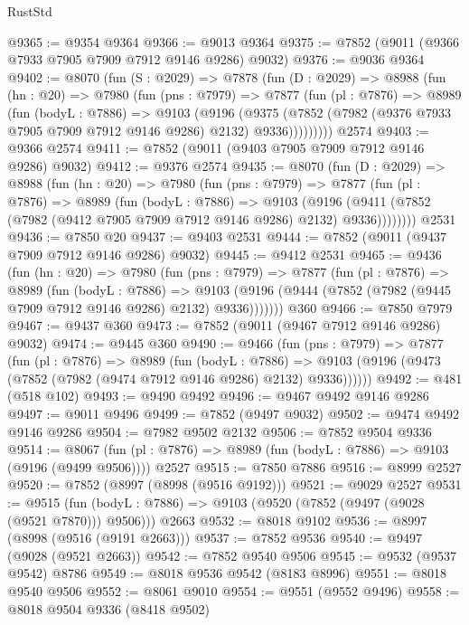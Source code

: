 \begin{lexlean}{RustStd}
\begin{coremodule}
@9365 := @9354 @9364
@9366 := @9013 @9364
@9375 := @7852 (@9011 (@9366 @7933 @7905 @7909 @7912 @9146 @9286) @9032)
@9376 := @9036 @9364
@9402 := @8070
    (fun (S : @2029) =>
    @7878
      (fun (D : @2029) =>
      @8988
        (fun (hn : @20) =>
        @7980
          (fun (pns : @7979) =>
          @7877
            (fun (pl : @7876) =>
            @8989
              (fun (bodyL : @7886) =>
              @9103
                (@9196
                  (@9375
                    (@7852 (@7982 (@9376 @7933 @7905 @7909 @7912 @9146 @9286) @2132) @9336)))))))))
    @2574
@9403 := @9366 @2574
@9411 := @7852 (@9011 (@9403 @7905 @7909 @7912 @9146 @9286) @9032)
@9412 := @9376 @2574
@9435 := @8070
    (fun (D : @2029) =>
    @8988
      (fun (hn : @20) =>
      @7980
        (fun (pns : @7979) =>
        @7877
          (fun (pl : @7876) =>
          @8989
            (fun (bodyL : @7886) =>
            @9103
              (@9196 (@9411 (@7852 (@7982 (@9412 @7905 @7909 @7912 @9146 @9286) @2132) @9336))))))))
    @2531
@9436 := @7850 @20
@9437 := @9403 @2531
@9444 := @7852 (@9011 (@9437 @7909 @7912 @9146 @9286) @9032)
@9445 := @9412 @2531
@9465 := @9436
    (fun (hn : @20) =>
    @7980
      (fun (pns : @7979) =>
      @7877
        (fun (pl : @7876) =>
        @8989
          (fun (bodyL : @7886) =>
          @9103 (@9196 (@9444 (@7852 (@7982 (@9445 @7909 @7912 @9146 @9286) @2132) @9336)))))))
    @360
@9466 := @7850 @7979
@9467 := @9437 @360
@9473 := @7852 (@9011 (@9467 @7912 @9146 @9286) @9032)
@9474 := @9445 @360
@9490 := @9466
    (fun (pns : @7979) =>
    @7877
      (fun (pl : @7876) =>
      @8989
        (fun (bodyL : @7886) =>
        @9103 (@9196 (@9473 (@7852 (@7982 (@9474 @7912 @9146 @9286) @2132) @9336))))))
@9492 := @481 (@518 @102)
@9493 := @9490 @9492
@9496 := @9467 @9492 @9146 @9286
@9497 := @9011 @9496
@9499 := @7852 (@9497 @9032)
@9502 := @9474 @9492 @9146 @9286
@9504 := @7982 @9502 @2132
@9506 := @7852 @9504 @9336
@9514 := @8067
    (fun (pl : @7876) => @8989 (fun (bodyL : @7886) => @9103 (@9196 (@9499 @9506))))
    @2527
@9515 := @7850 @7886
@9516 := @8999 @2527
@9520 := @7852 (@8997 (@8998 (@9516 @9192)))
@9521 := @9029 @2527
@9531 := @9515
    (fun (bodyL : @7886) => @9103 (@9520 (@7852 (@9497 (@9028 (@9521 @7870))) @9506)))
    @2663
@9532 := @8018 @9102
@9536 := @8997 (@8998 (@9516 (@9191 @2663)))
@9537 := @7852 @9536
@9540 := @9497 (@9028 (@9521 @2663))
@9542 := @7852 @9540 @9506
@9545 := @9532 (@9537 @9542) @8786
@9549 := @8018 @9536 @9542 (@8183 @8996)
@9551 := @8018 @9540 @9506
@9552 := @8061 @9010
@9554 := @9551 (@9552 @9496)
@9558 := @8018 @9504 @9336 (@8418 @9502)

\end{coremodule}
\end{lexlean}
